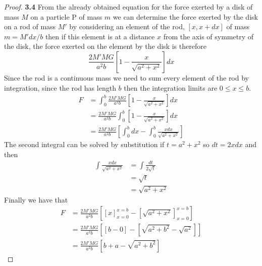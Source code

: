 \documentclass[11pt]{article}
\begin{document}
	\begin{proof}{\textbf{3.4}}
        From the already obtained equation for the force exerted by a disk of
        mass $M$ on a particle P of mass $m$ we can determine the force exerted
        by the disk on a rod of mass $M'$ by considering an element of the rod,
        $[x,x+dx]$ of mass $m=M'dx/b$ then if this element is at a distance $x$
        from the axis of symmetry of the disk, the force exerted on the element
        by the disk is therefore
        $$\frac{2M'MG}{a^2b} \left[ 1 - \frac{x}{\sqrt{a^2 + x^2}} \right]dx$$
        Since the rod is a continuous mass we need to sum every element of the
        rod by integration, since the rod has length $b$ then the integration
        limits are $0 \leq x \leq b$.
        \begin{align*}
            F &= \int_0^{b} \frac{2M'MG}{a^2b} \left[ 1 - \frac{x}{\sqrt{a^2 + x^2}} \right]dx \\
              &= \frac{2M'MG}{a^2b} \int_0^{b} \left[ 1 - \frac{x}{\sqrt{a^2 + x^2}} \right]dx \\
              &= \frac{2M'MG}{a^2b} \left[\int_0^{b} dx - \int_0^{b} \frac{xdx}{\sqrt{a^2 + x^2}} \right]
        \end{align*}
        The second integral can be solved by substitution if $t = a^2 + x^2$
        so $dt = 2x dx$ and then
        \begin{align*}
            \int \frac{xdx}{\sqrt{a^2 + x^2}} &= \int \frac{dt}{2 \sqrt{t}} \\
                &= \sqrt{t} \\
                &= \sqrt{a^2 + x^2}
        \end{align*}
        Finally we have that
        \begin{align*}
            F &= \frac{2M'MG}{a^2b} \left[ \left[ x \right]_{x=0}^{x=b} - [\sqrt{a^2 + x^2}]_{x=0}^{x=b} \right] \\
              &= \frac{2M'MG}{a^2b} \left[ [b - 0] - [\sqrt{a^2 + b^2} - \sqrt{a^2}] \right] \\
              &= \frac{2M'MG}{a^2b} \left[ b + a - \sqrt{a^2 + b^2} \right]
        \end{align*}
    \end{proof}
\end{document}
